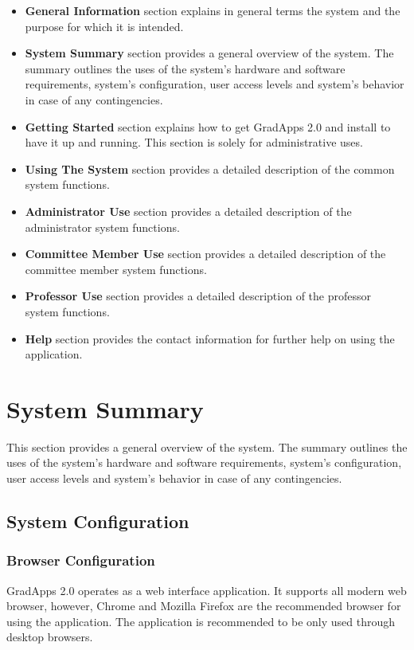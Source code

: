 \documentclass[fontsize=12pt,paper=letter,twoside]{scrartcl}
\begin{document}
\begin{itemize}
\item \textbf{General Information} section explains in general terms the system and the purpose for which it is
intended.
\item \textbf{System Summary} section provides a general overview of the system. The summary outlines the uses of
the system’s hardware and software requirements, system’s configuration, user access levels and
system’s behavior in case of any contingencies.
\item \textbf{Getting Started} section explains how to get GradApps 2.0 and install to have it up and running. This section is solely for administrative uses.
\item \textbf{Using The System} section provides a detailed description of the common system functions.
\item \textbf{Administrator Use} section provides a detailed description of the administrator system functions.
\item \textbf{Committee Member Use} section provides a detailed description of the committee member system functions.
\item \textbf{Professor Use} section provides a detailed description of the professor system functions.
\item \textbf{Help} section provides the contact information for further help on using the application.
\end{itemize}

\newpage
\section{System Summary}
This section provides a general overview of the system. The summary outlines the uses of
the system's hardware and software requirements, system’s configuration, user access levels and
system’s behavior in case of any contingencies.

\subsection{System Configuration} \label{system_conf}

\subsubsection{Browser Configuration}
GradApps 2.0 operates as a web interface application. It supports all modern web browser, however, Chrome and Mozilla Firefox are the recommended browser for using the application. The application is recommended to be only used through desktop browsers.
\end{document}
